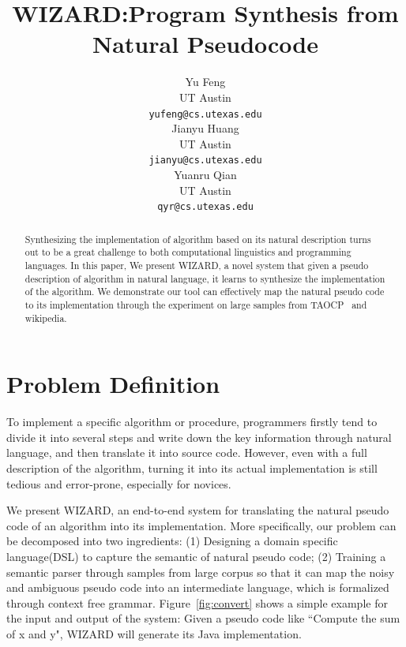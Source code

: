 \documentclass[11pt]{article}
\title{WIZARD:Program Synthesis from Natural Pseudocode}
\author{Yu Feng \\
  UT Austin \\
  {\tt yufeng@cs.utexas.edu} \\\And
  Jianyu Huang \\
  UT Austin \\
  {\tt jianyu@cs.utexas.edu}  \\\And
    Yuanru Qian \\
  UT Austin \\
  {\tt qyr@cs.utexas.edu} \\}
\date{}
\begin{document}
\maketitle
\begin{abstract}
  Synthesizing the implementation of algorithm based on its 
  natural description turns out to be a great challenge to both 
  computational linguistics and programming languages. In this paper,
  We present WIZARD, a novel system that given a pseudo description 
  of algorithm in natural language, it learns to synthesize the 
  implementation of the algorithm.  We demonstrate our tool can effectively
  map the natural pseudo code to its implementation through the
  experiment on large samples from TAOCP~\cite{knuth1998art} and wikipedia.
\end{abstract}

\section{Problem Definition}
To implement a specific algorithm or procedure, programmers firstly tend to 
divide it into several steps and write down the key information through
natural language, and then translate it into source code. However, even 
with a full description of the algorithm, turning it into its actual 
implementation is still tedious and error-prone, especially for novices.

We present WIZARD, an end-to-end system for translating the natural pseudo code
of an algorithm into its implementation. More specifically,
our problem can be decomposed into two ingredients: (1) Designing a domain 
specific language(DSL) to capture the semantic of natural pseudo code; 
(2) Training a semantic parser through samples from large corpus so that it can
 map the noisy and ambiguous pseudo code into an intermediate language, which is 
 formalized through context free grammar. Figure~\ref{fig:convert} shows a 
 simple example for the input and output of the system: Given a pseudo code like 
 ``Compute the sum of x and y", WIZARD will generate its Java implementation.
\end{document}
